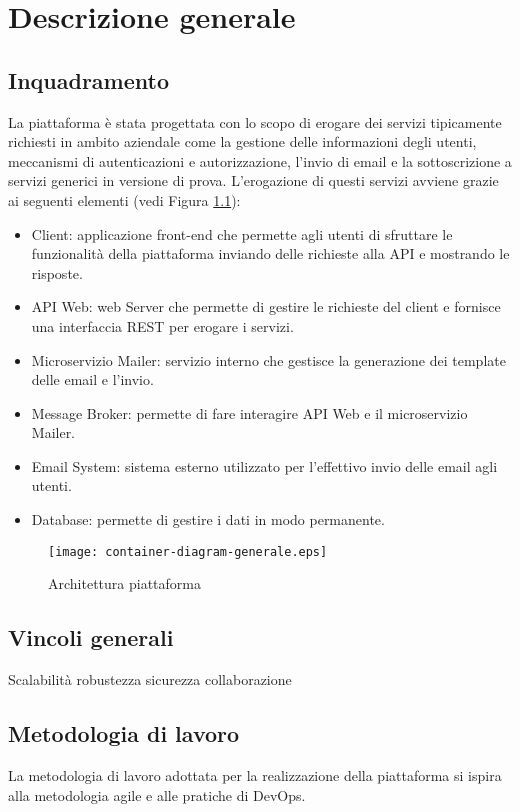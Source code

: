 \chapter{Descrizione generale}

\section{Inquadramento}
La piattaforma è stata progettata con lo scopo di erogare dei servizi tipicamente richiesti in ambito aziendale come la gestione delle
informazioni degli utenti, meccanismi di autenticazioni e autorizzazione, l'invio di
email e la sottoscrizione a servizi generici in versione di prova.
L'erogazione di questi servizi avviene grazie ai seguenti elementi (vedi Figura \ref{fig:Piattaforma}):
\begin{itemize}
    \itemsep0em
    \item Client: applicazione front-end che permette agli utenti di sfruttare le funzionalità della piattaforma inviando delle richieste alla API e mostrando le risposte.
    \item API Web: web Server che permette di gestire le richieste del client e fornisce una interfaccia REST per erogare i servizi.
    \item Microservizio Mailer: servizio interno che gestisce la generazione dei template delle email e l'invio.
    \item Message Broker: permette di fare interagire API Web e il microservizio Mailer.
    \item Email System: sistema esterno utilizzato per l'effettivo invio delle email agli utenti.
    \item Database: permette di gestire i dati in modo permanente.
\end{itemize}

\begin{figure}[H]
    \centering
    \texttt{[image: container-diagram-generale.eps]}
    \caption{Architettura piattaforma}
    \label{fig:Piattaforma}
\end{figure}
\newpage

\section{Vincoli generali}
Scalabilità
robustezza
sicurezza
collaborazione


\section{Metodologia di lavoro}
La metodologia di lavoro adottata per la realizzazione della piattaforma si ispira alla metodologia agile e alle pratiche di DevOps.


